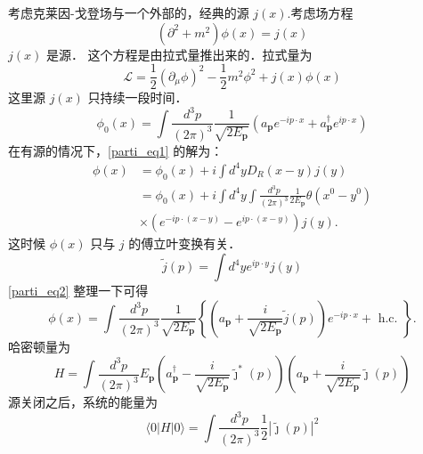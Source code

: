 
考虑克莱因-戈登场与一个外部的，经典的源 $j(x)$.考虑场方程
\begin{equation}\label{parti_eq1}
(\partial^2+m^2)\phi(x) = j(x)
\end{equation}
$j(x)$ 是源． 这个方程是由拉式量推出来的．拉式量为
\begin{equation}
\mathcal L = \frac{1}{2} (\partial_\mu\phi)^2 - \frac{1}{2} m^2 \phi^2 + j(x) \phi(x)
\end{equation}
这里源 $j(x)$ 只持续一段时间．
\begin{equation}
\phi_{0}(x)=\int \frac{d^{3} p}{(2 \pi)^{3}} \frac{1}{\sqrt{2 E_{\mathbf{p}}}}\left(a_{\mathbf{p}} e^{-i p \cdot x}+a_{\mathbf{p}}^{\dagger} e^{i p \cdot x}\right)
\end{equation}
在有源的情况下，\autoref{parti_eq1} 的解为：
\begin{equation}\label{parti_eq2}
\begin{aligned}
\phi(x) & =\phi_{0}(x)+i \int d^{4} y D_{R}(x-y) j(y) \\
& =\phi_{0}(x)+i \int d^{4} y \int \frac{d^{3} p}{(2 \pi)^{3}} \frac{1}{2 E_{\mathbf{p}}} \theta\left(x^{0}-y^{0}\right) \\
& \times\left(e^{-i p \cdot(x-y)}-e^{i p \cdot(x-y)}\right) j(y) .
\end{aligned}
\end{equation}
这时候 $\phi(x)$ 只与 $j$ 的傅立叶变换有关．
\begin{equation}
\tilde j (p) = \int d^4 y e^{ip \cdot y} j(y)
\end{equation}
\autoref{parti_eq2} 整理一下可得
\begin{equation}
\phi(x)=\int \frac{d^{3} p}{(2 \pi)^{3}} \frac{1}{\sqrt{2 E_{\mathbf{p}}}}\left\{\left(a_{\mathbf{p}}+\frac{i}{\sqrt{2 E_{\mathbf{p}}}} \tilde{j}(p)\right) e^{-i p \cdot x}+\text { h.c. }\right\} .
\end{equation}
哈密顿量为
\begin{equation}
H=\int \frac{d^{3} p}{(2 \pi)^{3}} E_{\mathbf{p}}\left(a_{\mathbf{p}}^{\dagger}-\frac{i}{\sqrt{2 E_{\mathbf{p}}}} \tilde{\jmath}^{*}(p)\right)\left(a_{\mathbf{p}}+\frac{i}{\sqrt{2 E_{\mathbf{p}}}} \tilde{\jmath}(p)\right)
\end{equation}
源关闭之后，系统的能量为
\begin{equation}
\langle 0|H| 0\rangle=\int \frac{d^{3} p}{(2 \pi)^{3}} \frac{1}{2}|\tilde{\jmath}(p)|^{2}
\end{equation}

